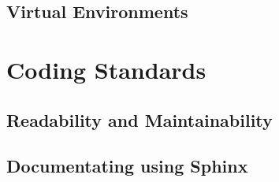 \documentclass[11pt]{article}
\begin{document}
\subsection{Virtual Environments}



\newpage

\section{Coding Standards}

\subsection{Readability and Maintainability}



\subsection{Documentating using Sphinx}



%
\end{document}
